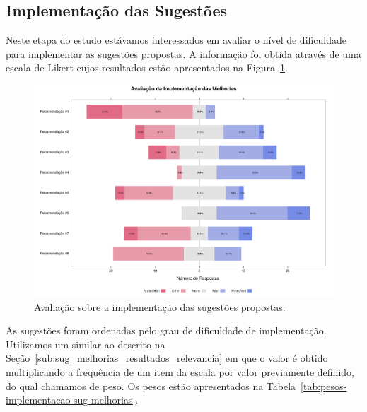 \subsection{Implementação das Sugestões}
\label{sub:sug_melhorias_resultados_implementacao}

Neste etapa do estudo estávamos interessados em avaliar o nível de dificuldade
para implementar as sugestões propostas. A informação foi obtida através de uma
escala de Likert cujos resultados estão apresentados na
Figura~\ref{fig:plot_likert_avaliacao_implementacao_melhorias}.

\begin{figure}[htpb]
    \centering
    \includegraphics[width=1.1\linewidth]{chapter-sugestoes-melhorias-fgrm/img/plot_likert_avaliacao_implementacao_melhorias.pdf}
    \caption{Avaliação sobre a  implementação das sugestões propostas.}
\label{fig:plot_likert_avaliacao_implementacao_melhorias}
\end{figure}

As sugestões foram ordenadas pelo grau de dificuldade de implementação.
Utilizamos um similar ao descrito na
Seção~\ref{sub:sug_melhorias_resultados_relevancia} em que o valor é obtido
multiplicando a frequência de um item da escala por valor previamente definido,
do qual chamamos de peso. Os pesos estão apresentados na
Tabela~\ref{tab:pesos-implementacao-sug-melhorias}.

\begin{table}[htpb]
\centering
{}
\caption{Pesos utilizados no ranqueamento das sugestões de melhorias}
\label{tab:pesos-implementacao-sug-melhorias}
\end{table}

